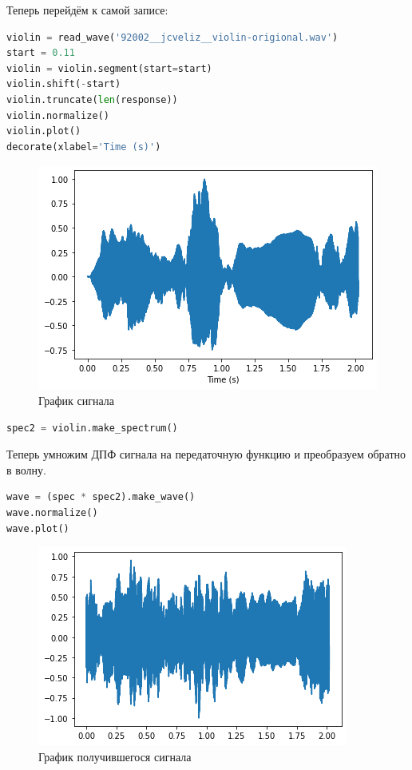 Теперь перейдём к самой записе:

\begin{lstlisting}[language=Python]
violin = read_wave('92002__jcveliz__violin-origional.wav')
start = 0.11
violin = violin.segment(start=start)
violin.shift(-start)
violin.truncate(len(response))
violin.normalize()
violin.plot()
decorate(xlabel='Time (s)')
\end{lstlisting}
\begin{figure}[H]
	\begin{center}
		\includegraphics[scale=1]{fig/lab10/lab10_3.png}
		\caption{График сигнала}
	\end{center}
\end{figure}

\begin{lstlisting}[language=Python]
spec2 = violin.make_spectrum()
\end{lstlisting}

Теперь умножим ДПФ сигнала на передаточную функцию и преобразуем обратно в волну.

\begin{lstlisting}[language=Python]
wave = (spec * spec2).make_wave()
wave.normalize()
wave.plot()
\end{lstlisting}
\begin{figure}[H]
	\begin{center}
		\includegraphics[scale=1]{fig/lab10/lab10_4.png}
		\caption{График получившегося сигнала}
	\end{center}
\end{figure}

